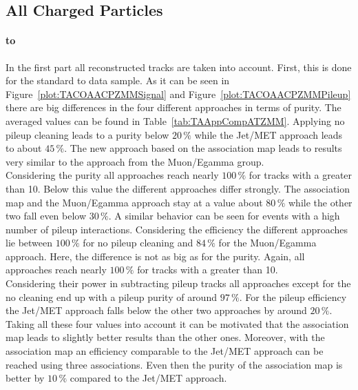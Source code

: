 \subsection{All Charged Particles \label{sec:TASEFRDACP}}

\paragraph{\Zz to \MM \label{sec:TASEFRDACPZMM}} 
In the first part all reconstructed tracks are taken into account. First, this is done for the standard \Zz to \MM data sample. As it can be seen in Figure~\ref{plot:TACOAACPZMMSignal} and Figure~\ref{plot:TACOAACPZMMPileup} there are big differences in the four different approaches in terms of purity. The averaged values can be found in Table~\ref{tab:TAAppCompATZMM}. Applying no pileup cleaning leads to a purity below $20\,\%$ while the Jet/MET approach leads to about $45\,\%$. The new approach based on the association map leads to results very similar to the approach from the Muon/Egamma group. \\
Considering the purity all approaches reach nearly $100\,\%$ for tracks with a \pt greater than 10\GeV. Below this value the different approaches differ strongly. The association map and the Muon/Egamma approach stay at a value about $80\,\%$ while the other two fall even below $30\,\%$. A similar behavior can be seen for events with a high number of pileup interactions. Considering the efficiency the different approaches lie between $100\,\%$ for no pileup cleaning and $84\,\%$ for the Muon/Egamma approach. Here, the difference is not as big as for the purity. Again, all approaches reach nearly $100\,\%$ for tracks with a \pt greater than 10\GeV. \\
Considering their power in subtracting pileup tracks all approaches except for the no cleaning end up with a pileup purity of around $97\,\%$. For the pileup efficiency the Jet/MET approach falls below the other two approaches by around $20\,\%$.\\
Taking all these four values into account it can be motivated that the association map leads to slightly better results than the other ones. Moreover, with the association map an efficiency comparable to the Jet/MET approach can be reached using three associations. Even then the purity of the association map is better by $10\,\%$ compared to the Jet/MET approach.

